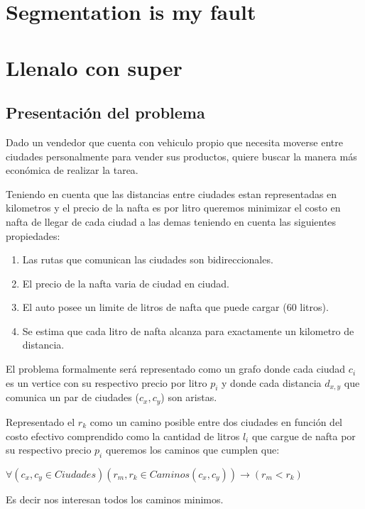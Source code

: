 \documentclass[12pt]{article}
\begin{document}
\section{Segmentation is my fault}



\section{Llenalo con super}

\subsection*{Presentación del problema}
Dado un vendedor que cuenta con vehiculo propio que necesita moverse entre ciudades personalmente para vender sus productos, quiere buscar la manera más económica de realizar la tarea.

Teniendo en cuenta que las distancias entre ciudades estan representadas en kilometros y el precio de la nafta es por litro queremos minimizar el costo en nafta de llegar de cada ciudad a las demas teniendo en cuenta las siguientes propiedades: 

\begin{enumerate}
    \item Las rutas que comunican las ciudades son bidireccionales.
    \item El precio de la nafta varia de ciudad en ciudad.
    \item El auto posee un limite de litros de nafta que puede cargar (60 litros).
    \item Se estima que cada litro de nafta alcanza para exactamente un kilometro de distancia.
\end{enumerate}

El problema formalmente será representado como un grafo donde cada ciudad
 $c_i$ es un vertice con su respectivo precio por litro $p_i$ y donde 
 cada distancia $d_{x,y}$ que comunica un par de ciudades ($c_x, c_y$) son aristas.

Representado el $r_k$ como un camino posible entre dos ciudades en función del costo efectivo
comprendido como la cantidad de litros $l_i$ que cargue de nafta por su respectivo precio $p_i$ queremos los caminos que cumplen que:

$\forall(c_x, c_y \in Ciudades)(r_{m}, r_k \in Caminos(c_x,c_y))\rightarrow(r_{m} < r_k)$

Es decir nos interesan todos los caminos minimos.
\end{document}
